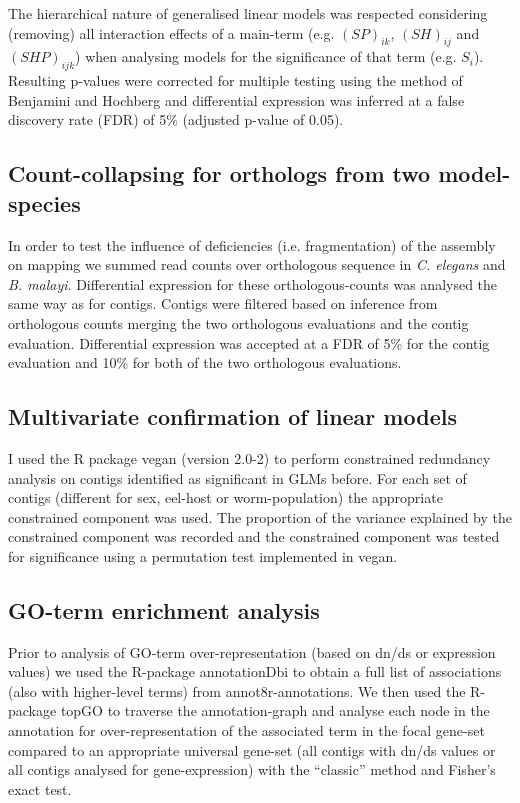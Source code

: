 The hierarchical nature of generalised linear models was respected
considering (removing) all interaction effects of a main-term
(e.g. $(SP)_{ik}$, $(SH)_{ij}$ and $(SHP)_{ijk}$) when analysing
models for the significance of that term (e.g. $S_i$). Resulting
p-values were corrected for multiple testing using the method of
Benjamini and Hochberg \cite{benjamini1995controlling} and
differential expression was inferred at a false discovery rate (FDR)
of 5\% (adjusted p-value of 0.05).

\subsection{Count-collapsing for orthologs from two model-species}
\label{collapse}

In order to test the influence of deficiencies (i.e. fragmentation) of
the assembly on mapping we summed read counts over orthologous
sequence in \textit{C. elegans} and \textit{B. malayi}.  Differential
expression for these orthologous-counts was analysed the same way as
for contigs. Contigs were filtered based on inference from orthologous
counts merging the two orthologous evaluations and the contig
evaluation. Differential expression was accepted at a FDR of 5\% for
the contig evaluation and 10\% for both of the two orthologous
evaluations.

\subsection{Multivariate confirmation of linear models}

I used the R package vegan (version 2.0-2) to perform constrained
redundancy analysis on contigs identified as significant in GLMs
before. For each set of contigs (different for sex, eel-host or
worm-population) the appropriate constrained component was used. The
proportion of the variance explained by the constrained component was
recorded and the constrained component was tested for significance
using a permutation test implemented in vegan.

\subsection{GO-term enrichment analysis}

Prior to analysis of GO-term over-representation (based on dn/ds or
expression values) we used the R-package annotationDbi
\cite{AnnotationDbi} to obtain a full list of associations (also with
higher-level terms) from annot8r-annotations. We then used the
R-package topGO \cite{topGO} to traverse the annotation-graph and
analyse each node in the annotation for over-representation of the
associated term in the focal gene-set compared to an appropriate
universal gene-set (all contigs with dn/ds values or all contigs
analysed for gene-expression) with the ``classic'' method and Fisher's
exact test.

